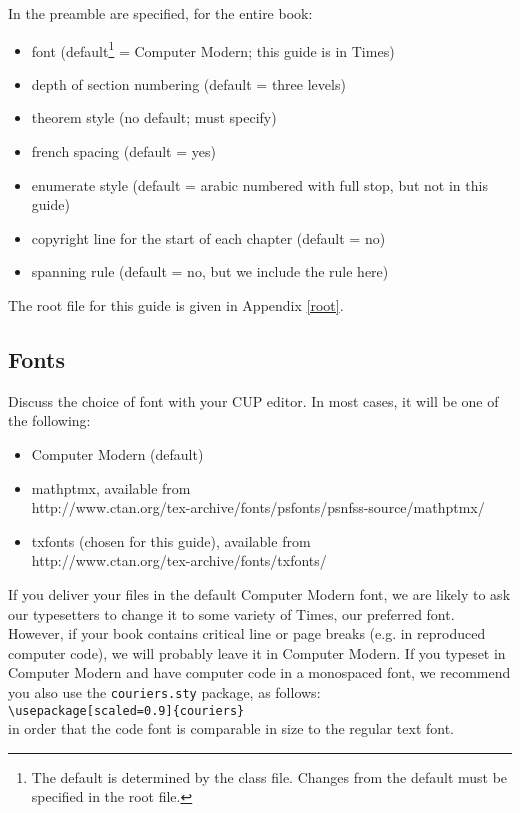 In the preamble are specified, for the entire book:
\begin{itemize}
\item font (default\footnote{The default is determined by the class file.
Changes from the default must be specified in the root file.}  = Computer Modern;
this guide is in Times)
\item depth of section numbering (default = three levels)
\item theorem style (no default; must specify)
\item french spacing (default = yes)
\item enumerate style (default = arabic numbered with full stop, but not in this guide)
\item copyright line for the start of each chapter (default = no)
\item spanning rule (default = no, but we include the rule here)
\end{itemize}

The root file for this guide is given in Appendix \ref{root}.

\subsection{Fonts}
Discuss the choice of font with your CUP editor. In most cases, it will be one of the following:
\begin{itemize}
\item Computer Modern (default)
\item mathptmx, available from\\
http://www.ctan.org/tex-archive/fonts/psfonts/psnfss-source/mathptmx/
\item txfonts (chosen for this guide), available from\\
http://www.ctan.org/tex-archive/fonts/txfonts/
\end{itemize}

If you deliver your files in the default Computer Modern font,
we are likely to ask our typesetters to change it to some variety of Times, our preferred font.
However, if your book contains critical line or page breaks (e.g. in reproduced
computer code), we will probably leave it in Computer Modern.
If you typeset in Computer Modern and have computer code in a monospaced font,
we recommend you also use the \verb"couriers.sty" package, as follows:\\[0.5\baselineskip]
\verb"\usepackage[scaled=0.9]{couriers}"\\[0.5\baselineskip]
in order that the code font is comparable in size to the regular text font.

